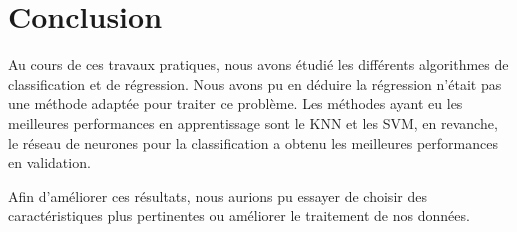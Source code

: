 \chapter{Conclusion}

Au cours de ces travaux pratiques, nous avons étudié les différents algorithmes de classification et de régression. Nous avons pu
en déduire la régression n'était pas une méthode adaptée pour traiter ce problème. Les méthodes ayant eu les meilleures performances
en apprentissage sont le KNN et les SVM, en revanche, le réseau de neurones pour la classification a obtenu les meilleures performances
en validation.

Afin d'améliorer ces résultats, nous aurions pu essayer de choisir des caractéristiques plus pertinentes ou améliorer le traitement de nos données.
